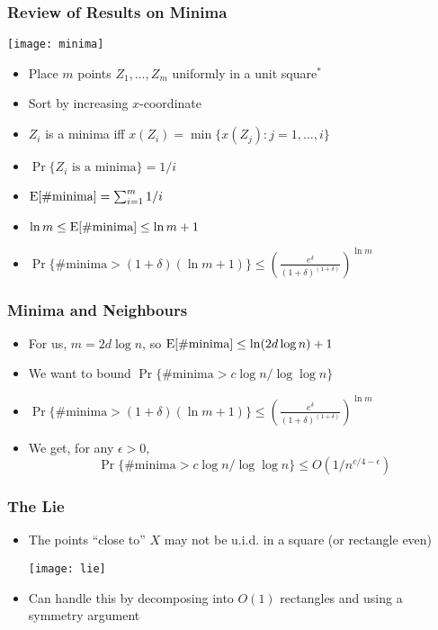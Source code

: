 \documentclass{beamer}
\begin{document}
\frame
{
  \frametitle{Review of Results on Minima}

   \begin{center} \texttt{[image: minima]} \end{center}
   \begin{itemize}
     \item Place $m$ points $Z_1,\ldots,Z_m$ uniformly in a unit square$^{*}$
     \item Sort by increasing $x$-coordinate
     \item $Z_i$ is a minima iff $x(Z_i) = \min\{ x(Z_j) : j=1,\ldots,i\}$
     \item $\Pr\{\mbox{$Z_i$ is a minima}\} = 1/i$
     \item $\mathrm{E}[\mbox{\#minima}] =\sum_{i=1}^m 1/i$
     \item $\ln m \le \mathrm{E}[\mbox{\#minima}] \le \ln m +1$
     \item $\Pr\{\mbox{\#minima} > (1+\delta)(\ln m +1)\} \le 
         \left(\frac{e^{\delta}}{(1+\delta)^{(1+\delta)}}\right)^{\ln m}$
   \end{itemize}
}

\frame
{
  \frametitle{Minima and Neighbours}

   \begin{itemize}
     \item For us, $m=2d\log n$, so $\mathrm{E}[\mbox{\#minima}] \le \ln(2d\log n) +1$
     \item We want to bound $\Pr\{\mbox{\#minima} > c\log n/\log\log n\}$
     \item $\Pr\{\mbox{\#minima} > (1+\delta)(\ln m +1)\} \le 
         \left(\frac{e^{\delta}}{(1+\delta)^{(1+\delta)}}\right)^{\ln m}$
     \item We get, for any $\epsilon > 0$,
       \[\Pr\{\mbox{\#minima} > c\log n/\log\log n\}
         \le O(1/n^{c/4-\epsilon}) \]
   \end{itemize}
}

\frame
{
  \frametitle{The Lie}

   \begin{itemize}
     \item The points ``close to'' $X$ may not be u.i.d. in a square (or
rectangle even)
      \begin{center}
        \texttt{[image: lie]} 
      \end{center}
     \item Can handle this by decomposing into $O(1)$ rectangles and using
           a symmetry argument
   \end{itemize}
}
\end{document}
